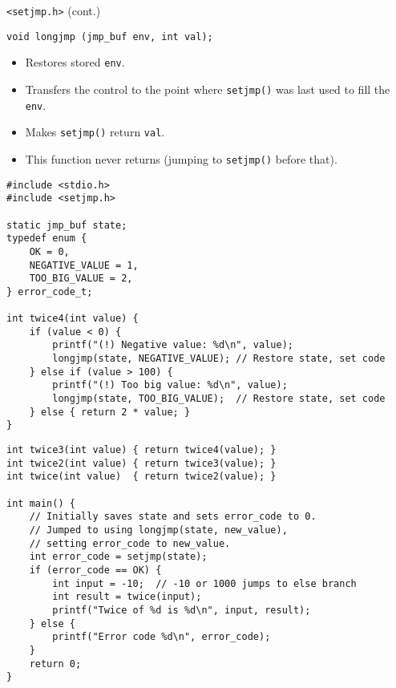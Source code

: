 \documentclass[aspectratio=169,14pt]{beamer}
\begin{document}
\begin{frame}[fragile]{\texttt{<setjmp.h>} (cont.)}
\begin{lstlisting}[style=cstyle]
void longjmp (jmp_buf env, int val);
\end{lstlisting}
\begin{itemize}
    \item Restores stored \texttt{env}.
    \item Transfers the control to the point where \texttt{setjmp()} was last used to fill the \texttt{env}.
    \item Makes \texttt{setjmp()} return \texttt{val}.
    \item This function never returns (jumping to \texttt{setjmp()} before that).
\end{itemize}
\end{frame}



\begin{frame}[fragile]{}
\begin{lstlisting}[style=cstyle]
#include <stdio.h>
#include <setjmp.h>

static jmp_buf state;
typedef enum {
    OK = 0,
    NEGATIVE_VALUE = 1,
    TOO_BIG_VALUE = 2,
} error_code_t;

int twice4(int value) {
    if (value < 0) {
        printf("(!) Negative value: %d\n", value);
        longjmp(state, NEGATIVE_VALUE); // Restore state, set code
    } else if (value > 100) {
        printf("(!) Too big value: %d\n", value);
        longjmp(state, TOO_BIG_VALUE);  // Restore state, set code
    } else { return 2 * value; }
}
\end{lstlisting}
\end{frame}



\begin{frame}[fragile]{}
\begin{lstlisting}[style=cstyle]
int twice3(int value) { return twice4(value); }
int twice2(int value) { return twice3(value); }
int twice(int value)  { return twice2(value); }

int main() {
    // Initially saves state and sets error_code to 0.
    // Jumped to using longjmp(state, new_value),
    // setting error_code to new_value.
    int error_code = setjmp(state);
    if (error_code == OK) {
        int input = -10;  // -10 or 1000 jumps to else branch
        int result = twice(input);
        printf("Twice of %d is %d\n", input, result);
    } else {
        printf("Error code %d\n", error_code);
    }
    return 0;
}
\end{lstlisting}
\end{frame}
\end{document}
